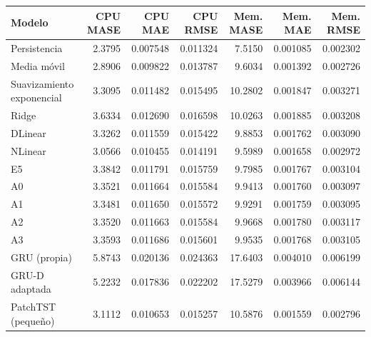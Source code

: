 \begin{tabular}{lrrrrrr}
\toprule
Modelo & CPU MASE & CPU MAE & CPU RMSE & Mem. MASE & Mem. MAE & Mem. RMSE \\
\midrule
Persistencia & 2.3795 & 0.007548 & 0.011324 & 7.5150 & 0.001085 & 0.002302 \\
Media móvil & 2.8906 & 0.009822 & 0.013787 & 9.6034 & 0.001392 & 0.002726 \\
Suavizamiento exponencial & 3.3095 & 0.011482 & 0.015495 & 10.2802 & 0.001847 & 0.003271 \\
Ridge & 3.6334 & 0.012690 & 0.016598 & 10.0263 & 0.001885 & 0.003208 \\
DLinear & 3.3262 & 0.011559 & 0.015422 & 9.8853 & 0.001762 & 0.003090 \\
NLinear & 3.0566 & 0.010455 & 0.014191 & 9.5989 & 0.001658 & 0.002972 \\
E5 & 3.3842 & 0.011791 & 0.015759 & 9.7985 & 0.001767 & 0.003104 \\
A0 & 3.3521 & 0.011664 & 0.015584 & 9.9413 & 0.001760 & 0.003097 \\
A1 & 3.3481 & 0.011650 & 0.015572 & 9.9291 & 0.001759 & 0.003095 \\
A2 & 3.3520 & 0.011663 & 0.015584 & 9.9668 & 0.001780 & 0.003117 \\
A3 & 3.3593 & 0.011686 & 0.015601 & 9.9535 & 0.001768 & 0.003105 \\
GRU (propia) & 5.8743 & 0.020136 & 0.024363 & 17.6403 & 0.004010 & 0.006199 \\
GRU-D adaptada & 5.2232 & 0.017836 & 0.022202 & 17.5279 & 0.003966 & 0.006144 \\
PatchTST (pequeño) & 3.1112 & 0.010653 & 0.015257 & 10.5876 & 0.001559 & 0.002796 \\
\bottomrule
\end{tabular}
